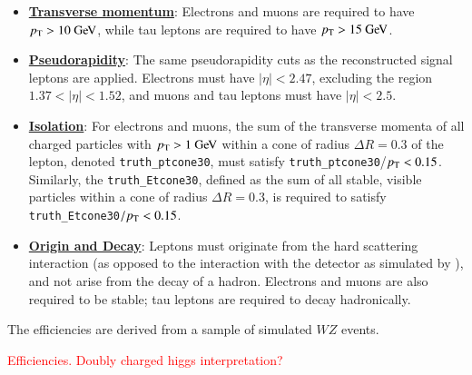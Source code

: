 \begin{itemize}
	\item \underline{\textbf{Transverse momentum}}: Electrons and muons are required to have $\pt>10 \GeV$, while tau leptons are required to have $\pt>15 \GeV$.
	\item \underline{\textbf{Pseudorapidity}}: The same pseudorapidity cuts as the reconstructed signal leptons are applied. Electrons must have $|\eta|<2.47$, excluding the region $1.37<|\eta|<1.52$, and muons and tau leptons must have $|\eta|<2.5$.
	\item \underline{\textbf{Isolation}}: For electrons and muons, the sum of the transverse momenta of all charged particles with $\pt>1 \GeV$ within a cone of radius $\Delta R=0.3$ of the lepton, denoted \texttt{truth\_ptcone30}, must satisfy \texttt{truth\_ptcone30}/$p_{\text{T}}<0.15$. Similarly, the \texttt{truth\_Etcone30}, defined as the sum of all stable, visible particles within a cone of radius $\Delta R=0.3$, is required to satisfy \texttt{truth\_Etcone30}$/p_{\text{T}}<0.15$.
	\item \underline{\textbf{Origin and Decay}}: Leptons must originate from the hard scattering interaction (as opposed to the interaction with the detector as simulated by \geant), and not arise from the decay of a hadron. Electrons and muons are also required to be stable; tau leptons are required to decay hadronically. 
\end{itemize}

The efficiencies are derived from a sample of simulated $WZ$ events. 

\textcolor{red}{Efficiencies. Doubly charged higgs interpretation?}

\printbibliography